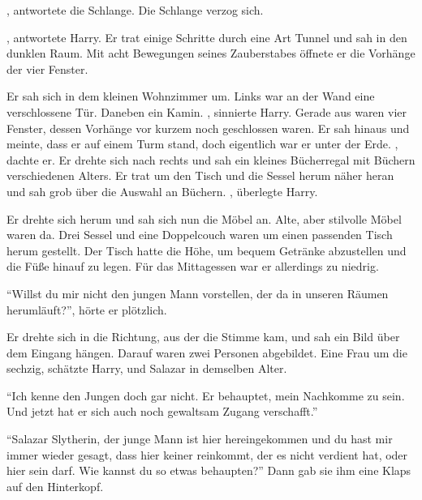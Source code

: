 , antwortete die Schlange.  Die Schlange verzog sich.

, antwortete Harry. Er trat einige Schritte durch eine Art Tunnel und sah in den dunklen Raum. Mit acht Bewegungen seines Zauberstabes öffnete er die Vorhänge der vier Fenster.

Er sah sich in dem kleinen Wohnzimmer um. Links war an der Wand eine verschlossene Tür. Daneben ein Kamin. , sinnierte Harry. Gerade aus waren vier Fenster, dessen Vorhänge vor kurzem noch geschlossen waren. Er sah hinaus und meinte, dass er auf einem Turm stand, doch eigentlich war er unter der Erde. , dachte er. Er drehte sich nach rechts und sah ein kleines Bücherregal mit Büchern verschiedenen Alters. Er trat um den Tisch und die Sessel herum näher heran und sah grob über die Auswahl an Büchern. , überlegte Harry.

Er drehte sich herum und sah sich nun die Möbel an. Alte, aber stilvolle Möbel waren da. Drei Sessel und eine Doppelcouch waren um einen passenden Tisch herum gestellt. Der Tisch hatte die Höhe, um bequem Getränke abzustellen und die Füße hinauf zu legen. Für das Mittagessen war er allerdings zu niedrig.

\enquote{Willst du mir nicht den jungen Mann vorstellen, der da in unseren Räumen herumläuft?}, hörte er plötzlich.

Er drehte sich in die Richtung, aus der die Stimme kam, und sah ein Bild über dem Eingang hängen. Darauf waren zwei Personen abgebildet. Eine Frau um die sechzig, schätzte Harry, und Salazar in demselben Alter.

\enquote{Ich kenne den Jungen doch gar nicht. Er behauptet, mein Nachkomme zu sein. Und jetzt hat er sich auch noch gewaltsam Zugang verschafft.}

\enquote{Salazar Slytherin, der junge Mann ist hier hereingekommen und du hast mir immer wieder gesagt, dass hier keiner reinkommt, der es nicht verdient hat, oder hier sein darf. Wie kannst du so etwas behaupten?} Dann gab sie ihm eine Klaps auf den Hinterkopf.

